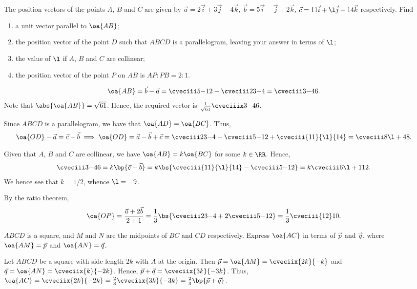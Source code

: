 \begin{problem}
    The position vectors of the points $A$, $B$ and $C$ are given by $\vec a = 2 \vec i + 3 \vec j - 4 \vec k$, $\vec b = 5 \vec i - \vec j + 2 \vec k$, $\vec c = 11 \vec i + \l \vec j + 14 \vec k$ respectively. Find

    \begin{enumerate}
        \item a unit vector parallel to $\oa{AB}$;
        \item the position vector of the point $D$ such that $ABCD$ is a parallelogram, leaving your answer in terms of $\l$;
        \item the value of $\l$ if $A$, $B$ and $C$ are collinear;
        \item the position vector of the point $P$ on $AB$ is $AP:PB = 2:1$.
    \end{enumerate}
\end{problem}
\clearpage
\begin{solution}
    \begin{ppart}
        \[\oa{AB} = \vec b - \vec a = \cveciii5{-1}2 - \cveciii23{-4} = \cveciii3{-4}6.\] Note that $\abs{\oa{AB}} = \sqrt{61}$. Hence, the required vector is $\frac1{\sqrt{61}}\cveciiix3{-4}6$.
    \end{ppart}
    \begin{ppart}
        Since $ABCD$ is a parallelogram, we have that $\oa{AD} = \oa{BC}$. Thus, \[\oa{OD} - \vec a = \vec c - \vec b \implies \oa{OD} = \vec a - \vec b + \vec c = \cveciii23{-4} - \cveciii5{-1}2 + \cveciii{11}{\l}{14} = \cveciii8{\l + 4}8.\]
    \end{ppart}
    \begin{ppart}
        Given that $A$, $B$ and $C$ are collinear, we have $\oa{AB} = k\oa{BC}$ for some $k \in \RR$. Hence, \[\cveciii3{-4}6 = k \bp{\vec c - \vec b} = k \bs{\cveciii{11}{\l}{14} - \cveciii5{-1}2} = k \cveciii6{\l + 1}{12}.\] We hence see that $k = 1/2$, whence $\l = -9$.
    \end{ppart}
    \begin{ppart}
        By the ratio theorem, \[\oa{OP} = \frac{\vec a + 2 \vec b}{2 + 1} = \frac13 \bs{\cveciii23{-4} + 2\cveciii5{-1}2} = \frac13 \cveciii{12}10.\]
    \end{ppart}
\end{solution}

\begin{problem}
    $ABCD$ is a square, and $M$ and $N$ are the midpoints of $BC$ and $CD$ respectively. Express $\oa{AC}$ in terms of $\vec p$ and $\vec q$, where $\oa{AM} = \vec p$ and $\oa{AN} = \vec q$.
\end{problem}
\begin{solution}
    Let $ABCD$ be a square with side length $2k$ with $A$ at the origin. Then $\vec p = \oa{AM} = \cveciix{2k}{-k}$ and $\vec q = \oa{AN} = \cveciix{k}{-2k}$. Hence, $\vec p + \vec q = \cveciix{3k}{-3k}$. Thus, $\oa{AC} = \cveciix{2k}{-2k} = \frac23 \cveciix{3k}{-3k} = \frac23 \bp{\vec p + \vec q}$.
\end{solution}

